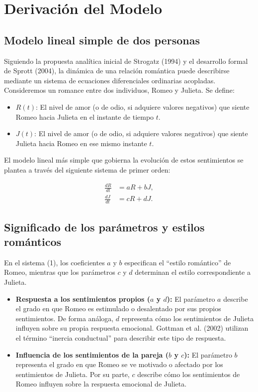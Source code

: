 \documentclass{article}
\begin{document}
\section{Derivación del Modelo}

\subsection{Modelo lineal simple de dos personas}

Siguiendo la propuesta analítica inicial de Strogatz (1994) y el desarrollo formal de Sprott (2004), la dinámica de una relación romántica puede describirse mediante un sistema de ecuaciones diferenciales ordinarias acopladas. Consideremos un romance entre dos individuos, Romeo y Julieta. Se define:

\begin{itemize}
    \item $R(t)$: El nivel de amor (o de odio, si adquiere valores negativos) que siente Romeo hacia Julieta en el instante de tiempo $t$.
    \item $J(t)$: El nivel de amor (o de odio, si adquiere valores negativos) que siente Julieta hacia Romeo en ese mismo instante $t$.
\end{itemize}

El modelo lineal más simple que gobierna la evolución de estos sentimientos se plantea a través del siguiente sistema de primer orden:

\begin{equation}
\begin{aligned}
    \frac{dR}{dt} &= aR + bJ, \\
    \frac{dJ}{dt} &= cR + dJ.
\end{aligned}
\tag{1}
\end{equation}

\subsection{Significado de los parámetros y estilos románticos}

En el sistema (1), los coeficientes $a$ y $b$ especifican el ``estilo romántico'' de Romeo, mientras que los parámetros $c$ y $d$ determinan el estilo correspondiente a Julieta.

\begin{itemize}
    \item \textbf{Respuesta a los sentimientos propios ($a$ y $d$):} El parámetro $a$ describe el grado en que Romeo es estimulado o desalentado por sus propios sentimientos. De forma análoga, $d$ representa cómo los sentimientos de Julieta influyen sobre su propia respuesta emocional. Gottman et al. (2002) utilizan el término ``inercia conductual'' para describir este tipo de respuesta.

    \item \textbf{Influencia de los sentimientos de la pareja ($b$ y $c$):} El parámetro $b$ representa el grado en que Romeo se ve motivado o afectado por los sentimientos de Julieta. Por su parte, $c$ describe cómo los sentimientos de Romeo influyen sobre la respuesta emocional de Julieta.
\end{itemize}
\end{document}
